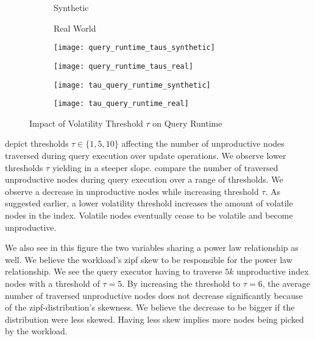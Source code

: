 \documentclass[abstracton,12pt]{scrartcl}
\theoremstyle{definition}
\begin{document}
\begin{figure}
  \centering
  \begin{subfigure}{0.49\linewidth}
    \centering
    Synthetic
  \end{subfigure}
  \begin{subfigure}{0.49\linewidth}
    \centering
    Real World
  \end{subfigure}
  \begin{subfigure}{0.49\linewidth}
    \centering
    \texttt{[image: query\_runtime\_taus\_synthetic]}
    \caption{}
    \label{fig:query_runtime_taus_synthetic}
  \end{subfigure}
  \begin{subfigure}{0.49\linewidth}
    \centering
    \texttt{[image: query\_runtime\_taus\_real]}
    \caption{}
    \label{fig:query_runtime_taus_real}
  \end{subfigure}
  \begin{subfigure}{0.49\linewidth}
    \centering
    \texttt{[image: tau\_query\_runtime\_synthetic]}
    \caption{}
    \label{fig:tau_query_runtime_synthetic}
  \end{subfigure}
  \begin{subfigure}{0.49\linewidth}
    \centering
    \texttt{[image: tau\_query\_runtime\_real]}
    \caption{}
    \label{fig:tau_query_runtime_real}
  \end{subfigure}
\caption{Impact of Volatility Threshold $\tau$ on Query Runtime}
\end{figure}

depict thresholds $\tau \in \{1,5,10\}$ affecting the number of unproductive
nodes traversed during query execution over update operations. We observe lower
thresholds $\tau$ yielding in a steeper slope.
 compare the
number of traversed unproductive nodes during query execution over a range of
thresholds. We observe a decrease in unproductive nodes while increasing
threshold $\tau$. As suggested earlier, a lower volatility threshold
increases the amount of volatile nodes in the index. Volatile nodes eventually
cease to be volatile and become unproductive. 

We also see in this figure
the two variables sharing a power law relationship as well. We believe the
workload's zipf skew to be responsible for the power law relationship. We see
the query executor having to traverse $5k$ unproductive index nodes with a
threshold of $\tau = 5$. By increasing the threshold to $\tau = 6$, the average
number of traversed unproductive nodes does not decrease significantly because
of the zipf-distribution's skewness. We believe the decrease to be bigger if the
distribution were less skewed. Having less skew implies more nodes being picked
by the workload.
\end{document}
